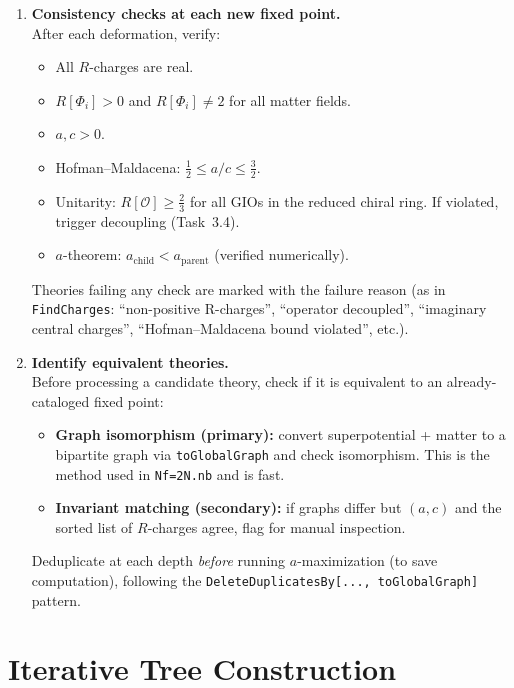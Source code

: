\documentclass[12pt]{article}
\begin{document}
\begin{enumerate}[label=\textbf{4.\arabic*}]
\item \textbf{Consistency checks at each new fixed point.} \\
  After each deformation, verify:
  \begin{itemize}
    \item All $R$-charges are real.
    \item $R[\Phi_i] > 0$ and $R[\Phi_i] \neq 2$ for all matter fields.
    \item $a, c > 0$.
    \item Hofman--Maldacena: $\tfrac{1}{2} \leq a/c \leq \tfrac{3}{2}$.
    \item Unitarity: $R[\mathcal{O}] \geq \frac{2}{3}$ for all GIOs in the reduced chiral ring. If violated, trigger decoupling (Task~3.4).
    \item $a$-theorem: $a_{\mathrm{child}} < a_{\mathrm{parent}}$ (verified numerically).
  \end{itemize}
  Theories failing any check are marked with the failure reason (as in \texttt{FindCharges}: ``non-positive R-charges'', ``operator decoupled'', ``imaginary central charges'', ``Hofman--Maldacena bound violated'', etc.).

\item \textbf{Identify equivalent theories.} \\
  Before processing a candidate theory, check if it is equivalent to an already-cataloged fixed point:
  \begin{itemize}
    \item \textbf{Graph isomorphism (primary):} convert superpotential + matter to a bipartite graph via \texttt{toGlobalGraph} and check isomorphism. This is the method used in \texttt{Nf=2N.nb} and is fast.
    \item \textbf{Invariant matching (secondary):} if graphs differ but $(a, c)$ and the sorted list of $R$-charges agree, flag for manual inspection.
  \end{itemize}
  Deduplicate at each depth \emph{before} running $a$-maximization (to save computation), following the \texttt{DeleteDuplicatesBy[..., toGlobalGraph]} pattern.

\end{enumerate}

\section{Iterative Tree Construction}
\end{document}
